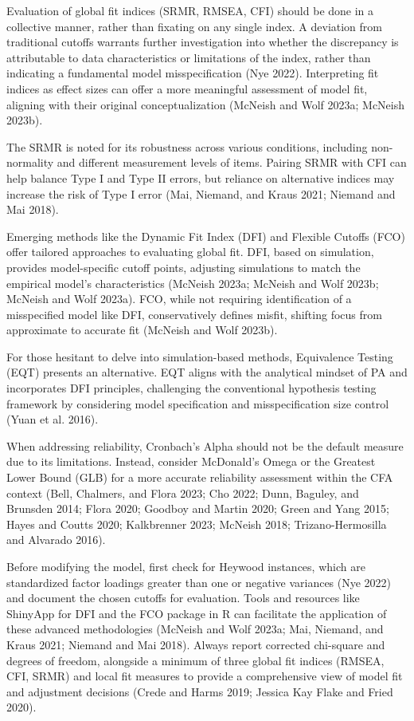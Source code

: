 \documentclass[
  a4paper,
]{article}
\begin{document}
Evaluation of global fit indices (SRMR, RMSEA, CFI) should be done in a
collective manner, rather than fixating on any single index. A deviation
from traditional cutoffs warrants further investigation into whether the
discrepancy is attributable to data characteristics or limitations of
the index, rather than indicating a fundamental model misspecification
(Nye 2022). Interpreting fit indices as effect sizes can offer a more
meaningful assessment of model fit, aligning with their original
conceptualization (McNeish and Wolf 2023a; McNeish 2023b).

The SRMR is noted for its robustness across various conditions,
including non-normality and different measurement levels of items.
Pairing SRMR with CFI can help balance Type I and Type II errors, but
reliance on alternative indices may increase the risk of Type I error
(Mai, Niemand, and Kraus 2021; Niemand and Mai 2018).

Emerging methods like the Dynamic Fit Index (DFI) and Flexible Cutoffs
(FCO) offer tailored approaches to evaluating global fit. DFI, based on
simulation, provides model-specific cutoff points, adjusting simulations
to match the empirical model's characteristics (McNeish 2023a; McNeish
and Wolf 2023b; McNeish and Wolf 2023a). FCO, while not requiring
identification of a misspecified model like DFI, conservatively defines
misfit, shifting focus from approximate to accurate fit (McNeish and
Wolf 2023b).

For those hesitant to delve into simulation-based methods, Equivalence
Testing (EQT) presents an alternative. EQT aligns with the analytical
mindset of PA and incorporates DFI principles, challenging the
conventional hypothesis testing framework by considering model
specification and misspecification size control (Yuan et al. 2016).

When addressing reliability, Cronbach's Alpha should not be the default
measure due to its limitations. Instead, consider McDonald's Omega or
the Greatest Lower Bound (GLB) for a more accurate reliability
assessment within the CFA context (Bell, Chalmers, and Flora 2023; Cho
2022; Dunn, Baguley, and Brunsden 2014; Flora 2020; Goodboy and Martin
2020; Green and Yang 2015; Hayes and Coutts 2020; Kalkbrenner 2023;
McNeish 2018; Trizano-Hermosilla and Alvarado 2016).

Before modifying the model, first check for Heywood instances, which are
standardized factor loadings greater than one or negative variances (Nye
2022) and document the chosen cutoffs for evaluation. Tools and
resources like ShinyApp for DFI and the FCO package in R can facilitate
the application of these advanced methodologies (McNeish and Wolf 2023a;
Mai, Niemand, and Kraus 2021; Niemand and Mai 2018). Always report
corrected chi-square and degrees of freedom, alongside a minimum of
three global fit indices (RMSEA, CFI, SRMR) and local fit measures to
provide a comprehensive view of model fit and adjustment decisions
(Crede and Harms 2019; Jessica Kay Flake and Fried 2020).
\end{document}
